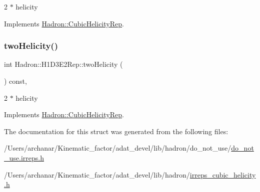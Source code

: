 2 $\ast$ helicity 

Implements \mbox{\hyperlink{structHadron_1_1CubicHelicityRep_af507aa56fc2747eacc8cb6c96db31ecc}{Hadron\+::\+Cubic\+Helicity\+Rep}}.

\mbox{\label{structHadron_1_1H1D3E2Rep_abc2ae293f19603d5c8d08fc6f7fa7830}} 
\subsubsection{\texorpdfstring{twoHelicity()}{twoHelicity()}\hspace{0.1cm}{\footnotesize\ttfamily [2/2]}}
{\footnotesize\ttfamily int Hadron\+::\+H1\+D3\+E2\+Rep\+::two\+Helicity (\begin{DoxyParamCaption}{ }\end{DoxyParamCaption}) const\hspace{0.3cm}{\ttfamily [inline]}, {\ttfamily [virtual]}}

2 $\ast$ helicity 

Implements \mbox{\hyperlink{structHadron_1_1CubicHelicityRep_af507aa56fc2747eacc8cb6c96db31ecc}{Hadron\+::\+Cubic\+Helicity\+Rep}}.



The documentation for this struct was generated from the following files\+:\begin{DoxyCompactItemize}
\item 
/\+Users/archanar/\+Kinematic\+\_\+factor/adat\+\_\+devel/lib/hadron/do\+\_\+not\+\_\+use/\mbox{\hyperlink{do__not__use_8irreps_8h}{do\+\_\+not\+\_\+use.\+irreps.\+h}}\item 
/\+Users/archanar/\+Kinematic\+\_\+factor/adat\+\_\+devel/lib/hadron/\mbox{\hyperlink{lib_2hadron_2irreps__cubic__helicity_8h}{irreps\+\_\+cubic\+\_\+helicity.\+h}}\end{DoxyCompactItemize}
